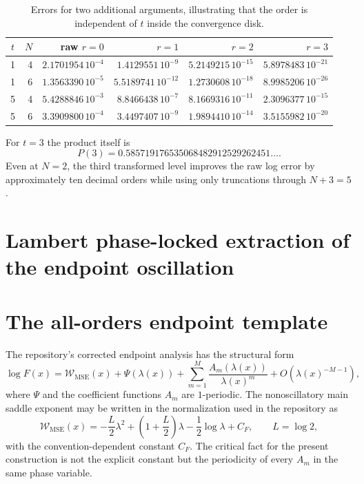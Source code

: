 \documentclass[11pt]{article}
\numberwithin{equation}{section}
\theoremstyle{definition}
\theoremstyle{remark}
\begin{document}
\begin{table}[htbp]
\centering
\caption{Errors for two additional arguments, illustrating that the order is independent of $t$ inside the convergence disk.}
\label{p8:tab:numeric-other}
\begin{tabular}{@{}c r r r r r@{}}
\toprule
$t$ & $N$ & raw $r=0$ & $r=1$ & $r=2$ & $r=3$ \\
\midrule
1 & 4 & $2.1701954\,10^{-4}$ & $1.4129551\,10^{-9}$ & $5.2149215\,10^{-15}$ & $5.8978483\,10^{-21}$ \\
1 & 6 & $1.3563390\,10^{-5}$ & $5.5189741\,10^{-12}$ & $1.2730608\,10^{-18}$ & $8.9985206\,10^{-26}$ \\
5 & 4 & $5.4288846\,10^{-3}$ & $8.8466438\,10^{-7}$ & $8.1669316\,10^{-11}$ & $2.3096377\,10^{-15}$ \\
5 & 6 & $3.3909800\,10^{-4}$ & $3.4497407\,10^{-9}$ & $1.9894410\,10^{-14}$ & $3.5155982\,10^{-20}$ \\
\bottomrule
\end{tabular}
\end{table}

For $t=3$ the product itself is
\begin{equation}
P(3)=0.585719176535068482912529262451\ldots.
\label{p8:eq:P3}
\end{equation}
Even at $N=2$, the third transformed level improves the raw log error by approximately ten decimal orders while using only truncations through $N+3=5$.

\section{Lambert phase-locked extraction of the endpoint oscillation}

\section{The all-orders endpoint template}
\label{p8:sec:lambert-template}

The repository's corrected endpoint analysis has the structural form
\begin{equation}
\log F(x)=\mathcal W_{\mathrm{MSE}}(x)+\Psi(\lambda(x))
+\sum_{m=1}^{M}\frac{A_m(\lambda(x))}{\lambda(x)^m}
+O\!\left(\lambda(x)^{-M-1}\right),
\label{p8:eq:endpoint-template}
\end{equation}
where $\Psi$ and the coefficient functions $A_m$ are $1$-periodic. The nonoscillatory main saddle exponent may be written in the normalization used in the repository as
\begin{equation}
\mathcal W_{\mathrm{MSE}}(x)
=-\frac{L}{2}\lambda^2+
\left(1+\frac L2\right)\lambda
-\frac12\log\lambda+C_F,
\qquad L=\log2,
\label{p8:eq:Wmse}
\end{equation}
with the convention-dependent constant $C_F$. The critical fact for the present construction is not the explicit constant but the periodicity of every $A_m$ in the same phase variable.
\end{document}
